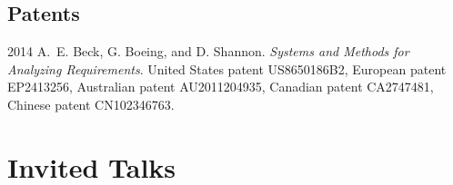 \documentclass[11pt,letterpaper]{report}
\begin{document}
    \subsection*{Patents}

    \begin{tablist}

        \item[2014] \tab{}A.~E. Beck, G. Boeing, and D. Shannon. \textit{Systems and Methods for Analyzing Requirements}. United States patent US8650186B2, European patent EP2413256, Australian patent AU2011204935, Canadian patent CA2747481, Chinese patent CN102346763.


    \end{tablist}



    \section*{Invited Talks}
\end{document}
